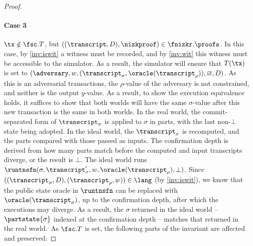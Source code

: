 \begin{proof}
  \paragraph{Case 3} $\tx \notin \fsc.T$, but $((\transcript, D), \nizkproof)
  \in \fnizkr.\proofs$. In this case, by \ref{inv:iswit} a witness must be
  recorded, and by \ref{inv:wit} this witness must be accessible to the
  simulator. As a result, the simulator will ensure that $T(\tx)$ is set to
  $(\adversary, w, (\transcript_\sigma, \oracle(\transcript_\rho)), \varnothing,\allowbreak
  D)$. As this is an adversarial transactions, the $\rho$-value of the adversary
  is not constrained, and neither is the output $y$-value. As a result, to show
  the execution equivalence holds, it suffices to show that both worlds will
  have the same $\sigma$-value after this new transaction is the same in both
  worlds.
  In the real world, the commit-separated form of $\transcript_\sigma$ is
    applied to $\sigma$ in parts, with the last non-$\bot$ state being adopted.
    In the ideal world, the $\transcript_\sigma$ is recomputed, and the parts
    compared with those passed as inputs. The confirmation depth is derived from
    how many parts match before the computed and input transcripts diverge, or
    the result is $\bot$. The ideal world runs $\runtnsfn(\sigma, \transcript_\sigma', w,
    \oracle(\transcript_\rho), \bot)$. Since $((\transcript_\sigma, D), (\transcript_\rho, w)) \in \lang$
  (by \ref{inv:iswit}), we know that the public state oracle in $\runtnsfn$ can
  be replaced with $\oracle(\transcript_\sigma)$, up to the confirmation depth,
  after which the executions may diverge. As a result, the $\sigma$ returned in
  the ideal world -- $\partstate{\sigma}$ indexed at the confirmation depth --
  matches that returned in the real world.\ 
  As $\fsc.T$ is set, the following parts of the invariant are
  affected and preserved:


\end{proof}
